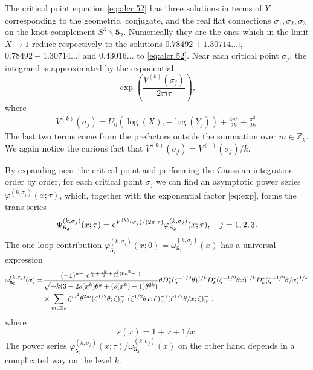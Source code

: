 \documentclass[a4paper,11pt]{article}	%
\def\md{\mathbf}
\def\IZ{\mathbb{Z}}
\newcommand{\re}{{\rm e}}
\newcommand{\ri}{{\mathsf{i}}}
\newcommand{\nn}{\nonumber \\}
\newcommand{\s}{\sigma}
\newcommand{\knot}[1]{\md{#1}}
\begin{document}
The critical point equation \eqref{eq:alcr.52} has three solutions in
terms of $Y$, corresponding to the geometric, conjugate, and the real flat
connections $\s_1, \s_2, \s_3$ on the knot complement $S^3\backslash
\knot{5}_2$.
%
Numerically they are the ones which in the limit $X\rightarrow 1$
reduce respectively to the solutions $0.78492+1.30714\ldots\ri$,
$0.78492-1.30714\ldots\ri$ and $0.43016\ldots$ to \eqref{eq:alcr.52}.
%
Near each critical point $\s_j$, the integrand is approximated by the
exponential
\begin{equation}
  \exp\left(\frac{V^{(k)}(\s_j)}{2\pi\ri\tau}\right),
  \label{eq:exp}
\end{equation}
where
\begin{align}
  V^{(k)}(\s_j) = U_0(\log(X),-\log(Y_j))+ \frac{3u^2}{2k} + \frac{\pi^2}{2k}.
\end{align}
The last two terms come from the prefactors outside the summation over
$m\in\IZ_k$.
We again notice the curious fact that $V^{(k)}(\sigma_j) = V^{(1)}(\s_j)/k$.

By expanding near the critical point and performing the Gaussian
integration order by order, for each critical point $\s_j$ we can find
an asymptotic power series $\varphi^{(k,\s_j)}(x;\tau)$, which,
together with the exponential factor \eqref{eq:exp}, forms the
trans-series
\begin{equation}
  \Phi_{\knot{5}_2}^{(k,\sigma_j)}(x;\tau) =
  \re^{V^{(k)}(\s_j)/(2\pi\ri\tau)}
  \varphi_{\knot{5}_2}^{(k,\s_j)}(x;\tau),\quad
  j=1,2,3.
\end{equation}
%
The one-loop contribution  $\varphi_{\knot{5}_2}^{(k,\s_j)}(x;0) =
\omega_{\knot{5}_2}^{(k,\s_j)}(x)$ has a universal
expression
\begin{align}
  \omega_{\knot{5}_2}^{(k,\s_j)}(x) =
  &\frac{(-1)^{n-1}\re^{\frac{\pi\ri}{4}+\frac{\pi\ri k}{2}+\frac{\pi\ri}{2k}(6n^2-1)}}
    {\sqrt{-k(3+2s(x^k)\theta^k+(s(x^k)-1)\theta^{2k})}}
    \theta
    D_k^*(\zeta^{-1/2}\theta)^{1/k}
    D_k^*(\zeta^{-1/2}\theta x)^{1/k}
    D_k^*(\zeta^{-1/2}\theta/x)^{1/k}
    \nn
  &\times\sum_{m\in\IZ_k}\zeta^{m^2}\theta^{2m}(\zeta^{1/2}\theta;\zeta)_m^{-1}
    (\zeta^{1/2}\theta x;\zeta)_m^{-1}
    (\zeta^{1/2}\theta/x;\zeta)_m^{-1},
\end{align}
where
\begin{equation}
  s(x) = 1+x+1/x.
\end{equation}
The power series
$\varphi_{\knot{5}_2}^{(k,\s_j)}(x;\tau)/\omega_{\knot{5}_2}^{(k,\s_j)}(x)$
on the other hand depends in a complicated way on the level $k$.
\end{document}
